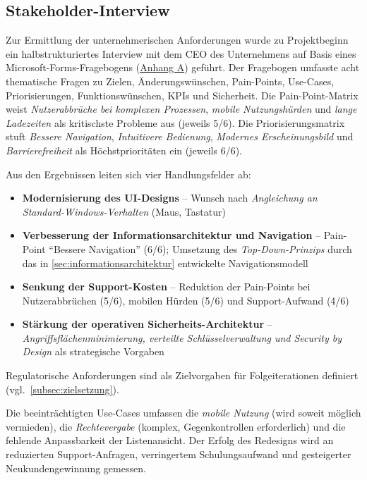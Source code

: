 \subsection{Stakeholder-Interview}\label{sec:stakeholder_interview}

Zur Ermittlung der unternehmerischen Anforderungen wurde zu Projektbeginn ein halbstrukturiertes Interview mit dem CEO des Unternehmens auf Basis eines Microsoft-Forms-Fragebogens (\hyperref[sec:anhang_a]{Anhang A}) geführt. Der Fragebogen umfasste acht thematische Fragen zu Zielen, Änderungswünschen, Pain-Points, Use-Cases, Priorisierungen, Funktionswünschen, KPIs und Sicherheit. Die Pain-Point-Matrix weist \emph{Nutzerabbrüche bei komplexen Prozessen}, \emph{mobile Nutzungshürden} und \emph{lange Ladezeiten} als kritischste Probleme aus (jeweils 5/6). Die Priorisierungsmatrix stuft \emph{Bessere Navigation}, \emph{Intuitivere Bedienung}, \emph{Modernes Erscheinungsbild} und \emph{Barrierefreiheit} als Höchstprioritäten ein (jeweils 6/6).

Aus den Ergebnissen leiten sich vier Handlungsfelder ab:
\begin{itemize}
    \item \textbf{Modernisierung des UI-Designs} -- Wunsch nach \emph{Angleichung an Standard-Windows-Verhalten} (Maus, Tastatur)
    \item \textbf{Verbesserung der Informationsarchitektur und Navigation} -- Pain-Point \enquote{Bessere Navigation} (6/6); Umsetzung des \emph{Top-Down-Prinzips} durch das in \autoref{sec:informationsarchitektur} entwickelte Navigationsmodell
    \item \textbf{Senkung der Support-Kosten} -- Reduktion der Pain-Points bei Nutzerabbrüchen (5/6), mobilen Hürden (5/6) und Support-Aufwand (4/6)
    \item \textbf{Stärkung der operativen Sicherheits-Architektur} -- \emph{Angriffsflächenminimierung, verteilte Schlüsselverwaltung und Security by Design} als strategische Vorgaben
\end{itemize}

Regulatorische Anforderungen sind als Zielvorgaben für Folgeiterationen definiert (vgl.\ \autoref{subsec:zielsetzung}).

Die beeinträchtigten Use-Cases umfassen die \emph{mobile Nutzung} (wird soweit möglich vermieden), die \emph{Rechtevergabe} (komplex, Gegenkontrollen erforderlich) und die fehlende Anpassbarkeit der Listenansicht. Der Erfolg des Redesigns wird an reduzierten Support-Anfragen, verringertem Schulungsaufwand und gesteigerter Neukundengewinnung gemessen.
